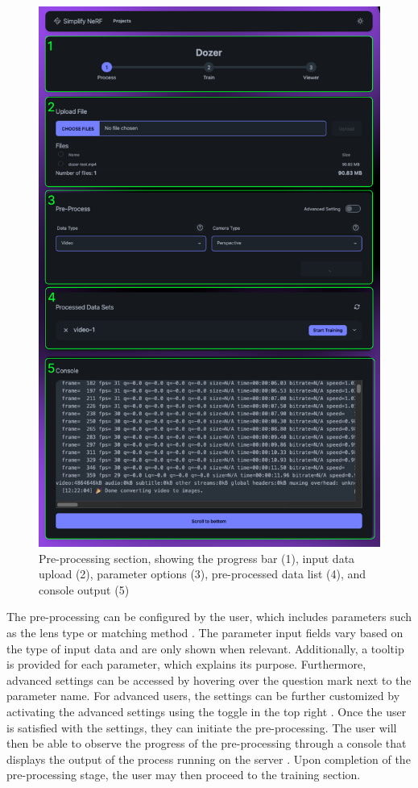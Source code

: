 \begin{figure}[h!]
  \centering
  \includegraphics[width=.65\textwidth]{figures/view-process.png}
  \caption{Pre-processing section, showing the progress bar (1), input data upload (2), parameter options (3), pre-processed data list (4), and console output (5)}
  \label{fig:design:input-section}
\end{figure}

The pre-processing can be configured by the user, which includes parameters such as the lens type or matching method .
The parameter input fields vary based on the type of input data and are only shown when relevant. 
Additionally, a tooltip is provided for each parameter, which explains its purpose. 
Furthermore, advanced settings can be accessed by hovering over the question mark next to the parameter name.
For advanced users, the settings can be further customized by activating the advanced settings using the toggle in the top right .
Once the user is satisfied with the settings, they can initiate the pre-processing. The user will then be able to observe the progress of the pre-processing through a console that displays the output of the process running on the server .
Upon completion of the pre-processing stage, the user may then proceed to the training section.


